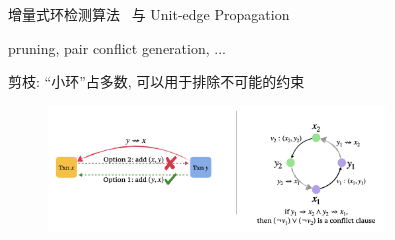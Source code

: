 \begin{frame}{}
	\begin{center}
		增量式环检测算法~ 与 Unit-edge Propagation
	\end{center}


\end{frame}

\begin{frame}{}{pruning, pair conflict generation, ...}
	\begin{center}
		剪枝: ``小环''占多数, 可以用于排除不可能的约束
	\end{center}

	\begin{figure}[H]
		\centering
		\includegraphics[width=0.8\textwidth]{figs/pruning-and-pair-conflict-generation.png}
	\end{figure}
\end{frame}


